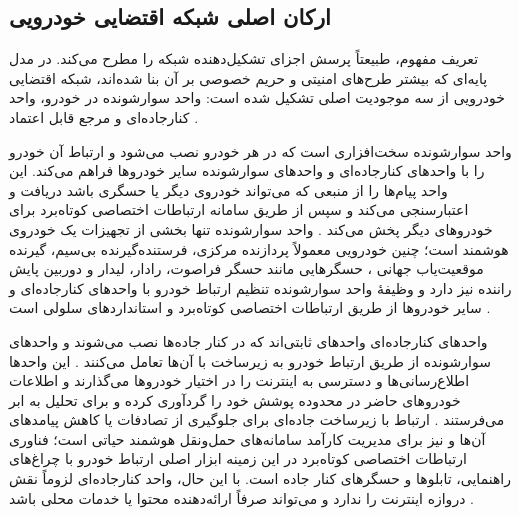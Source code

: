 \subsection{ارکان اصلی شبکه اقتضایی خودرویی}

تعریف مفهوم، طبیعتاً پرسش اجزای تشکیل‌دهنده شبکه را مطرح می‌کند. در مدل پایه‌ای که بیشتر طرح‌های امنیتی و حریم خصوصی بر آن بنا شده‌اند، شبکه اقتضایی خودرویی از سه موجودیت اصلی تشکیل شده است: واحد سوارشونده در خودرو، واحد کنارجاده‌ای و مرجع قابل اعتماد \cite{rahmawatiagustinaSystematicLiteratureReview2025}.

واحد سوارشونده  سخت‌افزاری است که در هر خودرو نصب می‌شود و ارتباط آن خودرو را با واحدهای کنارجاده‌ای و واحدهای سوارشونده سایر خودروها فراهم می‌کند. این واحد پیام‌ها را از منبعی که می‌تواند خودروی دیگر یا حسگری باشد دریافت و اعتبارسنجی می‌کند و سپس از طریق سامانه ارتباطات اختصاصی کوتاه‌برد  برای خودروهای دیگر پخش می‌کند \cite{hozouriOverviewVANETVehicular2023}. واحد سوارشونده تنها بخشی از تجهیزات یک خودروی هوشمند است؛ چنین خودرویی معمولاً پردازنده مرکزی، فرستنده‌گیرنده بی‌سیم، گیرنده موقعیت‌یاب جهانی ، حسگرهایی مانند حسگر فراصوت، رادار، لیدار  و دوربین پایش راننده نیز دارد و وظیفهٔ واحد سوارشونده تنظیم ارتباط خودرو با واحدهای کنارجاده‌ای و سایر خودروها از طریق ارتباطات اختصاصی کوتاه‌برد و استانداردهای سلولی است \cite{hozouriOverviewVANETVehicular2023}.

واحدهای کنارجاده‌ای  واحدهای ثابتی‌اند که در کنار جاده‌ها نصب می‌شوند و واحدهای سوارشونده از طریق ارتباط خودرو به زیرساخت با آن‌ها تعامل می‌کنند \cite{hozouriOverviewVANETVehicular2023}. این واحدها اطلاع‌رسانی‌ها و دسترسی به اینترنت را در اختیار خودروها می‌گذارند و اطلاعات خودروهای حاضر در محدوده پوشش خود را گردآوری کرده و برای تحلیل به ابر می‌فرستند \cite{hozouriOverviewVANETVehicular2023}. ارتباط با زیرساخت جاده‌ای برای جلوگیری از تصادفات یا کاهش پیامدهای آن‌ها و نیز برای مدیریت کارآمد سامانه‌های حمل‌ونقل هوشمند حیاتی است؛ فناوری ارتباطات اختصاصی کوتاه‌برد در این زمینه ابزار اصلی ارتباط خودرو با چراغ‌های راهنمایی، تابلوها و حسگرهای کنار جاده است. با این حال، واحد کنارجاده‌ای لزوماً نقش دروازه اینترنت را ندارد و می‌تواند صرفاً ارائه‌دهنده محتوا یا خدمات محلی باشد \cite{luConnectedVehiclesSolutions2014}.

